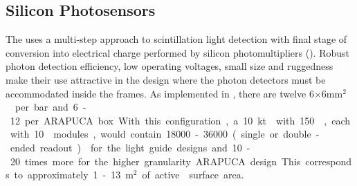 




\subsection{Silicon Photosensors}
\label{sec:fdsp-pd-ps}

The  uses a multi-step approach to scintillation light detection with final stage of conversion into electrical charge performed by silicon photomultipliers (). Robust photon detection efficiency, low operating voltages, small size and ruggedness make their use attractive in the \single design where the photon detectors must be accommodated inside the  frames. 
As implemented in , there are twelve \num{6}$\times$\num{6}\si{mm$^2$}  per bar and 6-12 per ARAPUCA box.
With this configuration, a \SI{10}{kt}  with \num{150} , each with \num{10}  modules, would contain \num{18000}-\num{36000} (single or double-ended readout)  for the light guide designs and 10-20 times more for the higher granularity ARAPUCA design. This corresponds to approximately \num{1}-\SI{13}{m$^2$} of active  surface area.

